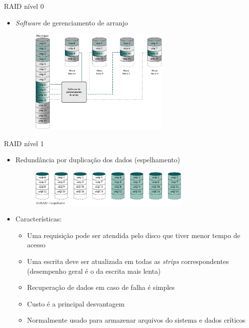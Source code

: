 \begin{slide}{RAID nível 0}
	\begin{itemize}
		\item \emph{Software} de gerenciamento de arranjo
			\begin{figure}[h]
				\centering
				\includegraphics[width=0.65\textwidth]{figs/mapeamento}
			\end{figure}
	\end{itemize}
\end{slide}

\begin{slide}{RAID nível 1}
	\begin{itemize}
		\item Redundância por duplicação dos dados (espelhamento)
			\begin{figure}[h]
				\centering
				\includegraphics[width=0.75\textwidth]{figs/raid1}
			\end{figure}
		\item Características:
			\begin{itemize}
				\item Uma requisição pode ser atendida pelo disco que tiver menor tempo de acesso
				\item Uma escrita deve ser atualizada em todas as \emph{strips} correspondentes (desempenho geral é o da escrita mais lenta)
				\item Recuperação de dados em caso de falha é simples
				\item Custo é a principal desvantagem 
				\item Normalmente usado para armazenar arquivos do sistema e dados críticos
			\end{itemize}
	\end{itemize}
\end{slide}

